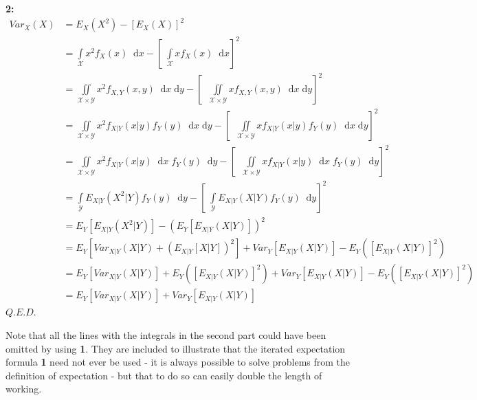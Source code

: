 \documentclass[12pt,a4paper]{article}
\newcommand{\diff}{\;\mathrm{d}}
\begin{document}
\textbf{2: }
\begin{align*}
Var_{X}(X) &= E_{{X}}(X^2) - [E_{X}(X)]^2\\
&= \int\limits_{\mathcal{X}}\!\! x^2 f_X(x)\;\diff x - \left[\;\int\limits_{\mathcal{X}}\!\! x f_X(x)\;\diff x\right]^2\\
&= \iint\limits_{\mathcal{X}\times\mathcal{Y}}\!\! x^2 f_{X,Y}(x,y)\;\diff x \diff y - \left[ \;\;\iint\limits_{\mathcal{X}\times\mathcal{Y}}\!\! x f_{X,Y}(x,y)\;\diff x\diff y\right]^2\\
&= \iint\limits_{\mathcal{X}\times\mathcal{Y}}\!\! x^2 f_{X|Y}(x|y) f_Y(y) \;\diff x\diff y - \left[\;\;\iint\limits_{\mathcal{X}\times\mathcal{Y}}\!\! x f_{X|Y}(x|y) f_Y(y) \;\diff x\diff y\right]^2\\
&= \iint\limits_{\mathcal{X}\times\mathcal{Y}}\!\! x^2 f_{X|Y}(x|y) \;\diff x\; f_Y(y)\;\diff y - \left[\;\;\iint\limits_{\mathcal{X}\times\mathcal{Y}}\!\! x f_{X|Y}(x|y)\;\diff x\; f_Y(y)\;\diff y\right]^2\\
&= \int\limits_{\mathcal{Y}}\!\! E_{{X|Y}}(X^2|Y) f_Y(y)\;\diff y - \left[\;\int\limits_{\mathcal{Y}}\!\! E_{{X|Y}}(X|Y) f_Y(y)\;\diff y\right]^2\\
&= E_{Y}[E_{{X|Y}}(X^2|Y)] - (E_{Y}[E_{{X|Y}}(X|Y)])^2\\
&= E_{Y}[Var_{{X|Y}}(X|Y) + (E_{{X|Y}}[X|Y])^2] + Var_{Y}[E_{{X|Y}}(X|Y)] - E_{Y}([E_{{X|Y}}(X|Y)]^2)\\
&= E_{Y}[Var_{{X|Y}}(X|Y)] + E_{Y}([E_{{X|Y}}(X|Y)]^2) + Var_{Y}[E_{{X|Y}}(X|Y)] - E_{Y}([E_{{X|Y}}(X|Y)]^2)\\
&= E_{Y}[Var_{{X|Y}}(X|Y)] + Var_{Y}[E_{{X|Y}}(X|Y)]
\end{align*}\hfill$Q.E.D.$

Note that all the lines with the integrals in the second part could have been omitted by using \textbf{1}. They are included to illustrate that the iterated expectation formula \textbf{1} need not ever be used - it is always possible to solve problems from the definition of expectation - but that to do so can easily double the length of working.
\end{document}
